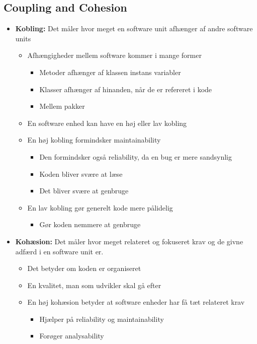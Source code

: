 \documentclass[a4, english]{article}
\begin{document}
\subsection{Coupling and Cohesion}
\begin{itemize}
	\item \textbf{Kobling:} Det måler hvor meget en software unit afhænger af andre software units 
  \begin{itemize}
  	\item Afhængigheder mellem software kommer i mange former
    \begin{itemize}
    	\item Metoder afhænger af klassen instans variabler
      \item Klasser afhænger af hinanden, når de er refereret i kode 
      \item Mellem pakker
    \end{itemize}
    \item En software enhed kan have en høj eller lav kobling
    \item En høj kobling formindsker maintainability
    \begin{itemize}
    	\item Den formindsker også reliability, da en bug er mere sandsynlig
      \item Koden bliver svære at læse
      \item Det bliver svære at genbruge
    \end{itemize}
    \item En lav kobling gør generelt kode mere pålidelig 
    \begin{itemize}
    	\item Gør koden nemmere at genbruge
    \end{itemize} 
  \end{itemize}
  \item \textbf{Kohæsion:} Det måler hvor meget relateret og fokuseret krav og de givne adfærd i en software unit er.
  \begin{itemize}
  	\item Det betyder om koden er organiseret
    \item En kvalitet, man som udvikler skal gå efter 
    \item En høj kohæsion betyder at software enheder har få tæt relateret krav
    \begin{itemize}
    	\item Hjælper på reliability og maintainability
      \item Forøger analysability

\end{itemize}
\end{itemize}
\end{itemize}
\end{document}
